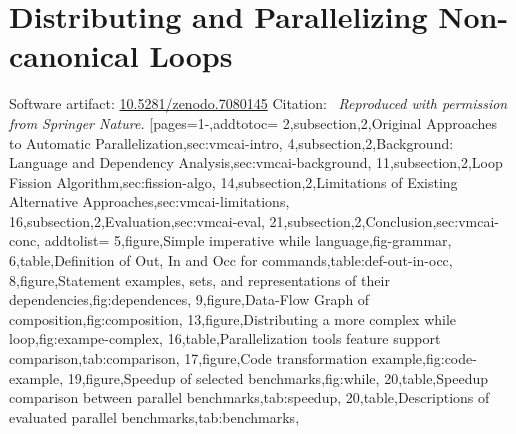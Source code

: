 \section{Distributing and Parallelizing Non-canonical Loops}\label{sec:vmcai}
\pageIconOpt
{}
{\noindent Software artifact: \href{https://zenodo.org/records/7080145}{10.5281/zenodo.7080145}
\newline\noindent Citation:~\cite{aubert202213}
\newline\newline\textit{Reproduced with permission from Springer Nature.}}
[pages={1-},addtotoc={
2,subsection,2,{Original Approaches to Automatic Parallelization},sec:vmcai-intro,
4,subsection,2,{Background: Language and Dependency Analysis},sec:vmcai-background,
11,subsection,2,{Loop Fission Algorithm},sec:fission-algo,
14,subsection,2,{Limitations of Existing Alternative Approaches},sec:vmcai-limitations,
16,subsection,2,{Evaluation},sec:vmcai-eval,
21,subsection,2,{Conclusion},sec:vmcai-conc},
addtolist={
5,figure,{Simple imperative while language},fig-grammar,
6,table,{Definition of Out, In and Occ for commands},table:def-out-in-occ,
8,figure,{Statement examples, sets, and representations of their dependencies},fig:dependences,
9,figure,Data-Flow Graph of composition,fig:composition,
13,figure,Distributing a more complex while loop,fig:exampe-complex,
16,table,Parallelization tools feature support comparison,tab:comparison,
17,figure,Code transformation example,fig:code-example,
19,figure,Speedup of selected benchmarks,fig:while,
20,table,Speedup comparison between parallel benchmarks,tab:speedup,
20,table,Descriptions of evaluated parallel benchmarks,tab:benchmarks},
